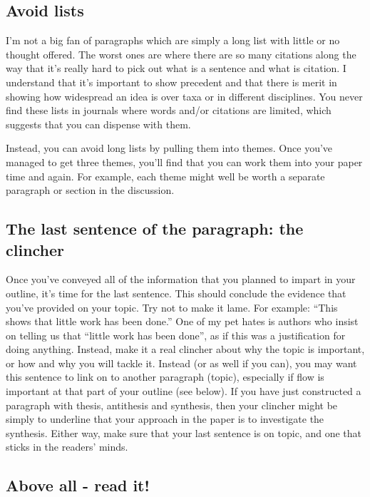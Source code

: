 \documentclass[
]{krantz}
\begin{document}
\hypertarget{avoid-lists}{%
\subsection{Avoid lists}\label{avoid-lists}}

I'm not a big fan of paragraphs which are simply a long list with little or no thought offered. The worst ones are where there are so many citations along the way that it's really hard to pick out what is a sentence and what is citation. I understand that it's important to show precedent and that there is merit in showing how widespread an idea is over taxa or in different disciplines. You never find these lists in journals where words and/or citations are limited, which suggests that you can dispense with them.

Instead, you can avoid long lists by pulling them into themes. Once you've managed to get three themes, you'll find that you can work them into your paper time and again. For example, each theme might well be worth a separate paragraph or section in the discussion.

\hypertarget{the-last-sentence-of-the-paragraph-the-clincher}{%
\subsection{The last sentence of the paragraph: the clincher}\label{the-last-sentence-of-the-paragraph-the-clincher}}

Once you've conveyed all of the information that you planned to impart in your outline, it's time for the last sentence. This should conclude the evidence that you've provided on your topic. Try not to make it lame. For example: ``This shows that little work has been done.'' One of my pet hates is authors who insist on telling us that ``little work has been done'', as if this was a justification for doing anything. Instead, make it a real clincher about why the topic is important, or how and why you will tackle it. Instead (or as well if you can), you may want this sentence to link on to another paragraph (topic), especially if flow is important at that part of your outline (see below). If you have just constructed a paragraph with thesis, antithesis and synthesis, then your clincher might be simply to underline that your approach in the paper is to investigate the synthesis. Either way, make sure that your last sentence is on topic, and one that sticks in the readers' minds.

\hypertarget{above-all---read-it}{%
\subsection{Above all - read it!}\label{above-all---read-it}}
\end{document}

